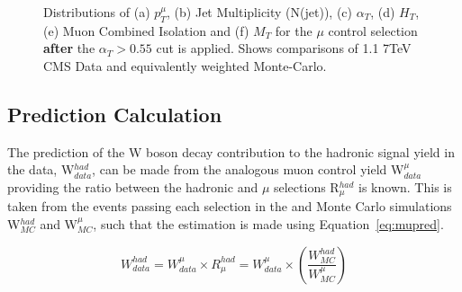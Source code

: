 \begin{figure}[htbp]
\begin{center}
\begin{minipage}[b]{1.\linewidth}
\end{minipage}
\caption{\label{fig:muonplots_afterat} Distributions of (a) $p_{T}^{\mu}$, (b) Jet Multiplicity (N(jet)), (c) $\alpha_{T}$, (d) $H_{T}$, (e) Muon Combined Isolation and (f) $M_{T}$ for the $\mu$ control selection \textbf{after} the $\alpha_{T} > 0.55$ cut is applied. Shows comparisons of 1.1  7TeV CMS Data and equivalently weighted Monte-Carlo.}
\label{fig:kinafter}
\end{center}
\end{figure}
\subsection{Prediction Calculation}

The prediction of the W boson decay contribution to the hadronic signal yield in the data, W$^{had}_{data}$, can be made from the analogous muon control yield W$^{\mu}_{data}$ providing the ratio between the hadronic and $\mu$ selections R$^{had}_{\mu}$ is known. This is taken from the events passing each selection in the \ttj and \wj Monte Carlo simulations W$^{had}_{MC}$ and W$^{\mu}_{MC}$, such that the estimation is made using Equation~\ref{eq:mupred}. 

\begin{equation}
W^{had}_{data} = W^{\mu}_{data}\times R^{had}_{\mu} = W^{\mu}_{data}\times (\frac{W^{had}_{MC}}{W^{\mu}_{MC}})
\label{eq:mupred}
\end{equation}

